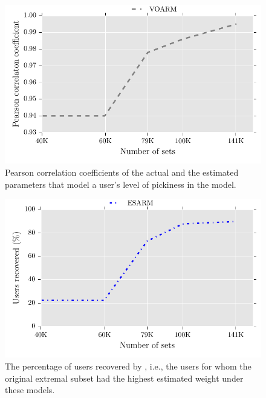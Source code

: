 \begin{figure}[t]
 \centerline{\includegraphics[scale=0.7]{figures/vo_pearson.pdf}}
  \caption{Pearson correlation coefficients of the actual and the estimated
    parameters that model a user's level of pickiness in the \VO model.}
  \label{fig:vo_pearson}
\end{figure}


\begin{figure}[t]
  \centerline{\includegraphics[scale=0.7]{figures/es_sets_recov.pdf}}
  \caption{The percentage of users recovered by \ES, i.e., the users for whom the
    original extremal subset had the highest estimated weight under these models. 
}
  \label{fig:es_sets_recov}
\end{figure}




